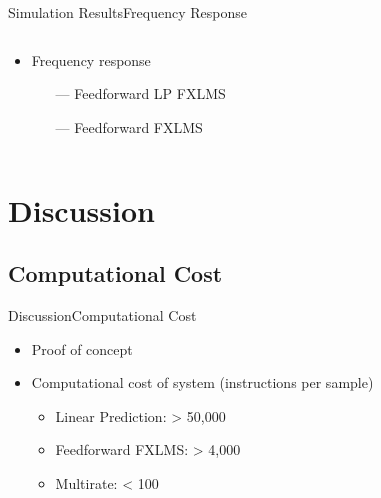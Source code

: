 \begin{frame}{Simulation Results}{Frequency Response}		
\begin{columns}
	\begin{column}{0.4\textwidth}
		\begin{itemize}
			\item Frequency response
			\begin{itemize}
				\item[\textcolor{MATLABorange}{---}] Feedforward LP FXLMS 
				\item[\textcolor{MATLABblue}{---}] Feedforward FXLMS  
			\end{itemize}
		\end{itemize}
	\end{column}
	\begin{column}{0.6\textwidth} 
		\resizebox{0.9\columnwidth}{!}{		
			}
	\end{column}
\end{columns}
\end{frame}


\section{Discussion}
\subsection{Computational Cost}

\begin{frame}{Discussion}{Computational Cost}		
\begin{itemize}
\item Proof of concept
\item Computational cost of system (instructions per sample)
	\begin{itemize}
		\item Linear Prediction: > 50,000 
		\item Feedforward FXLMS: > 4,000 
		\item Multirate: < 100
	\end{itemize}
\end{itemize}

\end{frame}
